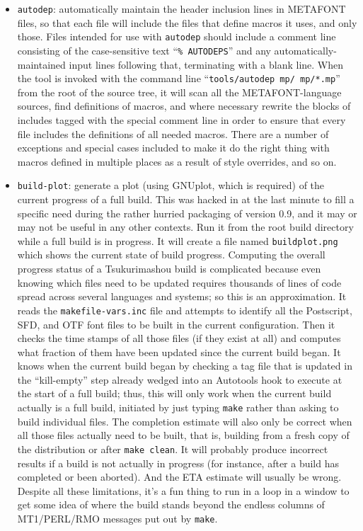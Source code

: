 \documentclass[14pt]{extarticle}
\begin{document}
\begin{itemize}

\item \texttt{autodep}: automatically maintain the header inclusion lines in
METAFONT files, so that each file will include the files that define macros
it uses, and only those.  Files intended for use with \texttt{autodep}
should include a comment line consisting of the case-sensitive text
``\texttt{\%\ AUTODEPS}'' and any automatically-maintained input lines
following that, terminating with a blank line.  When the tool is invoked
with the command line ``\texttt{tools/autodep mp/ mp/*.mp}'' from the root
of the source tree, it will scan all the METAFONT-language sources, find
definitions of macros, and where necessary rewrite the blocks of includes
tagged with the special comment line in order to ensure that every file
includes the definitions of all needed macros.  There are a number of
exceptions and special cases included to make it do the right thing with
macros defined in multiple places as a result of style overrides, and so on.

\item \texttt{build-plot}: generate a plot (using GNUplot, which is
required) of the current progress of a full build.  This was hacked in at
the last minute to fill a specific need during the rather hurried
packaging of version 0.9, and it may or may not be useful in any other
contexts.  Run it from the root build directory while a full build is in
progress.  It will create a file named \texttt{buildplot.png} which shows
the current state of build progress.  Computing the overall progress status
of a Tsukurimashou build is complicated because even knowing which files
need to be updated requires thousands of lines of code spread across several
languages and systems; so this is an approximation.  It reads the
\texttt{makefile-vars.inc} file and attempts to identify all the Postscript,
SFD, and OTF font files to be built in the current configuration.  Then it
checks the time stamps of all those files (if they exist at all) and
computes what fraction of them have been updated since the current build
began.  It knows when the current build began by checking a tag file that is
updated in the ``kill-empty'' step already wedged into an Autotools hook to
execute at the start of a full build; thus, this will only
work when the current build actually is a full build, initiated by just typing \texttt{make}
rather than asking to build individual files.  The completion estimate will
also only be correct when all those files actually need to be built, that
is, building from a fresh copy of the distribution or after \texttt{make
clean}.  It will probably produce incorrect results if a build is
not actually in progress (for instance, after a build has completed or been
aborted).  And the ETA estimate will usually be wrong.  Despite all these
limitations, it's a fun thing to run in a loop in a window to get some idea
of where the build stands beyond the endless columns of MT1/PERL/RMO
messages put out by \texttt{make}.


\end{itemize}
\end{document}
